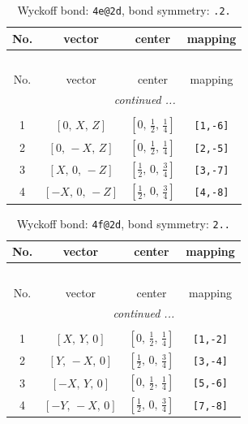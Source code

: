 \documentclass[fleqn,8pt]{jsarticle}
\begin{document}
\renewcommand{\arraystretch}{1.2}
\begin{longtable}{cccc}
\caption{Wyckoff bond: {\tt 4e@2d}, bond symmetry: {\tt .2.}}
 \\
 \hline \hline
No. & vector & center & mapping \\ \hline \endfirsthead

\multicolumn{3}{l}{\tablename\ \thetable{}} \\
 \hline \hline
No. & vector & center & mapping \\ \hline \endhead

 \hline \hline
\multicolumn{3}{r}{\footnotesize\it continued ...} \\ \endfoot

 \hline \hline
\multicolumn{3}{r}{} \\ \endlastfoot

1 & $\left[ 0,\, X,\, Z \right]$ & $\left[ 0,\, \frac{1}{2},\, \frac{1}{4} \right]$ & {\tt [1,-6]} \\ \hline
2 & $\left[ 0,\, - X,\, Z \right]$ & $\left[ 0,\, \frac{1}{2},\, \frac{1}{4} \right]$ & {\tt [2,-5]} \\ \hline
3 & $\left[ X,\, 0,\, - Z \right]$ & $\left[ \frac{1}{2},\, 0,\, \frac{3}{4} \right]$ & {\tt [3,-7]} \\ \hline
4 & $\left[ - X,\, 0,\, - Z \right]$ & $\left[ \frac{1}{2},\, 0,\, \frac{3}{4} \right]$ & {\tt [4,-8]} \\
\end{longtable}
\renewcommand{\arraystretch}{1.2}
\begin{longtable}{cccc}
\caption{Wyckoff bond: {\tt 4f@2d}, bond symmetry: {\tt 2..}}
 \\
 \hline \hline
No. & vector & center & mapping \\ \hline \endfirsthead

\multicolumn{3}{l}{\tablename\ \thetable{}} \\
 \hline \hline
No. & vector & center & mapping \\ \hline \endhead

 \hline \hline
\multicolumn{3}{r}{\footnotesize\it continued ...} \\ \endfoot

 \hline \hline
\multicolumn{3}{r}{} \\ \endlastfoot

1 & $\left[ X,\, Y,\, 0 \right]$ & $\left[ 0,\, \frac{1}{2},\, \frac{1}{4} \right]$ & {\tt [1,-2]} \\ \hline
2 & $\left[ Y,\, - X,\, 0 \right]$ & $\left[ \frac{1}{2},\, 0,\, \frac{3}{4} \right]$ & {\tt [3,-4]} \\ \hline
3 & $\left[ - X,\, Y,\, 0 \right]$ & $\left[ 0,\, \frac{1}{2},\, \frac{1}{4} \right]$ & {\tt [5,-6]} \\ \hline
4 & $\left[ - Y,\, - X,\, 0 \right]$ & $\left[ \frac{1}{2},\, 0,\, \frac{3}{4} \right]$ & {\tt [7,-8]} \\
\end{longtable}
\end{document}
